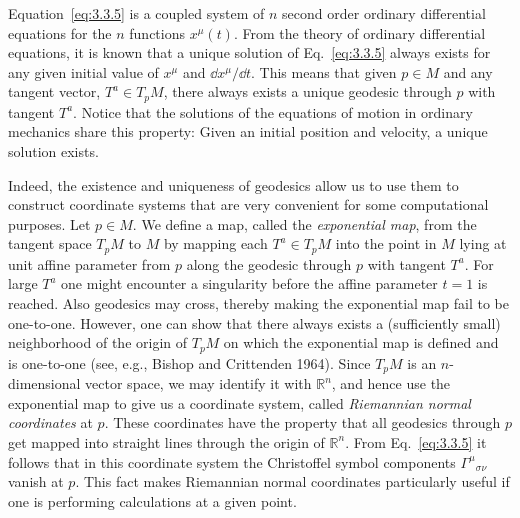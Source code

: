Equation~\eqref{eq:3.3.5} is a coupled system of $n$ second order ordinary differential
equations for the $n$ functions $x^\mu(t)$. From the theory of ordinary differential equations, it is known that a unique solution of Eq.~\eqref{eq:3.3.5} always exists for any
given initial value of $x^\mu$ and $\dd x^\mu/\dd t$. This means that given $p\in M$ and any tangent
vector, $T^a\in T_pM$, there always exists a unique geodesic through $p$ with tangent $T^a$.
Notice that the solutions of the equations of motion in ordinary mechanics share this
property: Given an initial position and velocity, a unique solution exists.

Indeed, the existence and uniqueness of geodesics allow us to use them to construct coordinate systems that are very convenient for some computational purposes.
Let $p\in M$. We define a map, called the \emph{exponential map}, from the tangent space
$T_pM$ to $M$ by mapping each $T^a\in T_pM$ into the point in $M$ lying at unit affine parameter
from $p$ along the geodesic through $p$ with tangent $T^a$. For large $T^a$ one might
encounter a singularity before the affine parameter $t=1$ is reached. Also geodesics
may cross, thereby making the exponential map fail to be one-to-one. However, one
can show that there always exists a (sufficiently small) neighborhood of the origin
of $T_pM$ on which the exponential map is defined and is one-to-one (see, e.g., Bishop
and Crittenden 1964). Since $T_pM$ is an $n$-dimensional vector space, we may identify
it with $\mathbb R^n$, and hence use the exponential map to give us a coordinate system, called
\emph{Riemannian normal coordinates} at $p$. These coordinates have the property that all
geodesics through $p$ get mapped into straight lines through the origin of $\mathbb R^n$. From
Eq.~\eqref{eq:3.3.5} it follows that in this coordinate system the Christoffel symbol
components $\Gamma^\mu{}_{\sigma\nu}$ vanish at $p$. This fact makes Riemannian normal coordinates
particularly useful if one is performing calculations at a given point.

